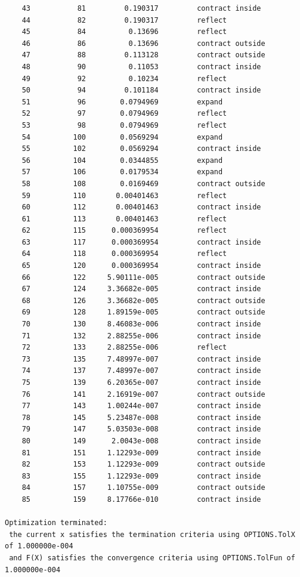 \begin{lstlisting}
    43           81         0.190317         contract inside
    44           82         0.190317         reflect
    45           84          0.13696         reflect
    46           86          0.13696         contract outside
    47           88         0.113128         contract outside
    48           90          0.11053         contract inside
    49           92          0.10234         reflect
    50           94         0.101184         contract inside
    51           96        0.0794969         expand
    52           97        0.0794969         reflect
    53           98        0.0794969         reflect
    54          100        0.0569294         expand
    55          102        0.0569294         contract inside
    56          104        0.0344855         expand
    57          106        0.0179534         expand
    58          108        0.0169469         contract outside
    59          110       0.00401463         reflect
    60          112       0.00401463         contract inside
    61          113       0.00401463         reflect
    62          115      0.000369954         reflect
    63          117      0.000369954         contract inside
    64          118      0.000369954         reflect
    65          120      0.000369954         contract inside
    66          122     5.90111e-005         contract outside
    67          124     3.36682e-005         contract inside
    68          126     3.36682e-005         contract outside
    69          128     1.89159e-005         contract outside
    70          130     8.46083e-006         contract inside
    71          132     2.88255e-006         contract inside
    72          133     2.88255e-006         reflect
    73          135     7.48997e-007         contract inside
    74          137     7.48997e-007         contract inside
    75          139     6.20365e-007         contract inside
    76          141     2.16919e-007         contract outside
    77          143     1.00244e-007         contract inside
    78          145     5.23487e-008         contract inside
    79          147     5.03503e-008         contract inside
    80          149      2.0043e-008         contract inside
    81          151     1.12293e-009         contract inside
    82          153     1.12293e-009         contract outside
    83          155     1.12293e-009         contract inside
    84          157     1.10755e-009         contract outside
    85          159     8.17766e-010         contract inside
 
Optimization terminated:
 the current x satisfies the termination criteria using OPTIONS.TolX of 1.000000e-004 
 and F(X) satisfies the convergence criteria using OPTIONS.TolFun of 1.000000e-004 
\end{lstlisting}

